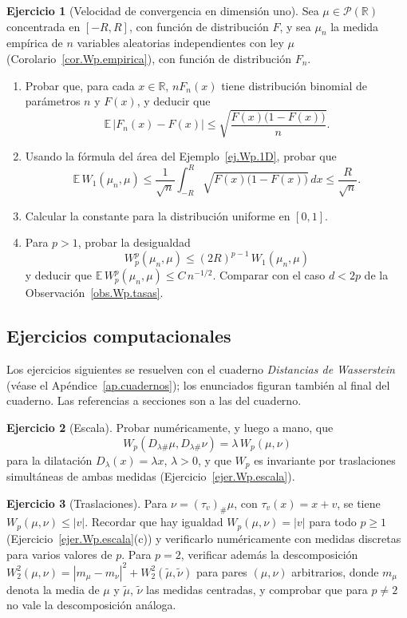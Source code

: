 \documentclass[12pt, a4paper]{amsbook}
\newcommand{\R}{{\mathbb R}}
\newcommand{\E}{{\mathbb E}}
\theoremstyle{remark}
\theoremstyle{definition}
\newtheorem{ejercicio}{Ejercicio}[chapter]
\numberwithin{section}{chapter}
\numberwithin{subsection}{section}
\numberwithin{equation}{section}
\numberwithin{figure}{chapter}
\begin{document}
\begin{ejercicio}[Velocidad de convergencia en dimensión uno]\label{ejer.Wp.empirica.1D}
Sea $\mu\in\mathcal P(\R)$ concentrada en $[-R,R]$, con función de
distribución $F$, y sea $\mu_n$ la medida empírica de $n$ variables
aleatorias independientes con ley $\mu$
(Corolario~\ref{cor.Wp.empirica}), con función de distribución $F_n$.
\begin{enumerate}[label=(\alph*)]
\item Probar que, para cada $x\in\R$, $nF_n(x)$ tiene distribución binomial
de parámetros $n$ y $F(x)$, y deducir que
\[
\E\,|F_n(x)-F(x)|\le\sqrt{\frac{F(x)\bigl(1-F(x)\bigr)}{n}}.
\]
\item Usando la fórmula del área del Ejemplo~\ref{ej.Wp.1D}, probar que
\[
\E\,W_1(\mu_n,\mu)\le\frac1{\sqrt n}\int_{-R}^R\sqrt{F(x)\bigl(1-F(x)\bigr)}\,dx
\le\frac R{\sqrt n}.
\]
\item Calcular la constante para la distribución uniforme en $[0,1]$.
\item Para $p>1$, probar la desigualdad
\[
W_p^p(\mu_n,\mu)\le(2R)^{p-1}\,W_1(\mu_n,\mu)
\]
y deducir que $\E\,W_p^p(\mu_n,\mu)\le C\,n^{-1/2}$. Comparar con el caso
$d<2p$ de la Observación~\ref{obs.Wp.tasas}.
\end{enumerate}
\end{ejercicio}

\subsection*{Ejercicios computacionales}

Los ejercicios siguientes se resuelven con el cuaderno \emph{Distancias de
Wasserstein} (véase el Apéndice~\ref{ap.cuadernos}); los enunciados figuran
también al final del cuaderno. Las referencias a secciones son a las del
cuaderno.

\begin{ejercicio}[Escala]\label{ejc.Wp.escala}
Probar numéricamente, y luego a mano, que
\[
W_p(D_{\lambda\#}\mu,D_{\lambda\#}\nu)=\lambda\,W_p(\mu,\nu)
\]
para la dilatación $D_\lambda(x)=\lambda x$, $\lambda>0$, y que $W_p$ es invariante
por traslaciones simultáneas de ambas medidas
(Ejercicio~\ref{ejer.Wp.escala}).
\end{ejercicio}

\begin{ejercicio}[Traslaciones]\label{ejc.Wp.traslaciones}
Para $\nu=(\tau_v)_\#\mu$, con $\tau_v(x)=x+v$, se tiene $W_p(\mu,\nu)\le|v|$.
Recordar que hay igualdad $W_p(\mu,\nu)=|v|$ para todo $p\ge1$
(Ejercicio~\ref{ejer.Wp.escala}(c)) y verificarlo numéricamente con medidas
discretas para varios valores de $p$. Para $p=2$, verificar además la
descomposición $W_2^2(\mu,\nu)=|m_\mu-m_\nu|^2+W_2^2(\tilde\mu,\tilde\nu)$
para pares $(\mu,\nu)$ arbitrarios, donde $m_\mu$ denota la media de $\mu$ y
$\tilde\mu$, $\tilde\nu$ las medidas centradas, y comprobar que para $p\ne2$
no vale la descomposición análoga.
\end{ejercicio}
\end{document}
